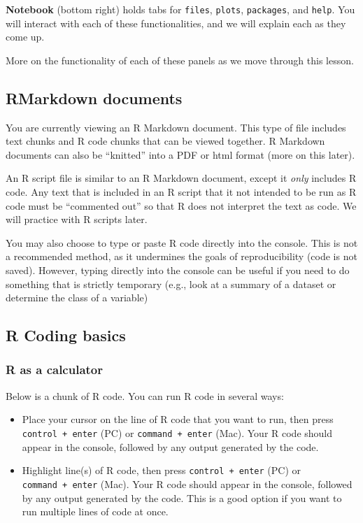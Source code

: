\documentclass[
]{article}
\begin{document}
\textbf{Notebook} (bottom right) holds tabs for \texttt{files},
\texttt{plots}, \texttt{packages}, and \texttt{help}. You will interact
with each of these functionalities, and we will explain each as they
come up.

More on the functionality of each of these panels as we move through
this lesson.

\hypertarget{rmarkdown-documents}{%
\subsection{RMarkdown documents}\label{rmarkdown-documents}}

You are currently viewing an R Markdown document. This type of file
includes text chunks and R code chunks that can be viewed together. R
Markdown documents can also be ``knitted'' into a PDF or html format
(more on this later).

An R script file is similar to an R Markdown document, except it
\emph{only} includes R code. Any text that is included in an R script
that it not intended to be run as R code must be ``commented out'' so
that R does not interpret the text as code. We will practice with R
scripts later.

You may also choose to type or paste R code directly into the console.
This is not a recommended method, as it undermines the goals of
reproducibility (code is not saved). However, typing directly into the
console can be useful if you need to do something that is strictly
temporary (e.g., look at a summary of a dataset or determine the class
of a variable)

\hypertarget{r-coding-basics}{%
\subsection{R Coding basics}\label{r-coding-basics}}

\hypertarget{r-as-a-calculator}{%
\subsubsection{R as a calculator}\label{r-as-a-calculator}}

Below is a chunk of R code. You can run R code in several ways:

\begin{itemize}
\item
  Place your cursor on the line of R code that you want to run, then
  press \texttt{control\ +\ enter} (PC) or \texttt{command\ +\ enter}
  (Mac). Your R code should appear in the console, followed by any
  output generated by the code.
\item
  Highlight line(s) of R code, then press \texttt{control\ +\ enter}
  (PC) or \texttt{command\ +\ enter} (Mac). Your R code should appear in
  the console, followed by any output generated by the code. This is a
  good option if you want to run multiple lines of code at once.
\end{itemize}
\end{document}
